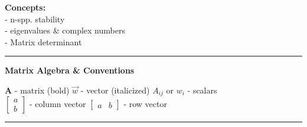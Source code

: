 \documentclass{article}
\newcommand{\ind}{\-\hspace{1cm}}
\begin{document}
\noindent{}

\textbf{Concepts:}\\
\ind - n-spp. stability\\
\ind - eigenvalues \& complex numbers\\
\ind - Matrix determinant

\rule[0.5ex]{\linewidth}{1pt}

\textbf{Matrix Algebra \& Conventions}
\begin{center}
\textbf{A} - matrix (bold) \ind \ind $\vec w$ - vector (italicized) \ind \ind $A_{ij}$ or $w_i$ - scalars\\
$\begin{bmatrix} a\\ b \end{bmatrix}$ - column vector \ind \ind $\begin{bmatrix} a & b \end{bmatrix}$ - row vector
\end{center}

\rule[0.5ex]{\linewidth}{1pt}
\end{document}
